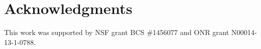 \documentclass[10pt,letterpaper]{article}
\begin{document}
\section{Acknowledgments}

This work was supported by NSF grant BCS \#1456077 and ONR grant N00014-13-1-0788. 


\setlength{\bibleftmargin}{.125in}
\setlength{\bibindent}{-\bibleftmargin}


\end{document}
